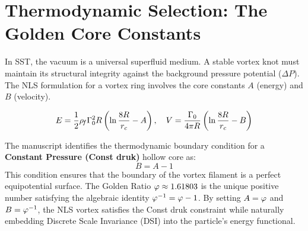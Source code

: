 \documentclass[11pt]{article}
\newcommand{\rc}{r_c}                                    %
\begin{document}
    \newpage



\begin{abstract}
This work formalizes the transition from classical Rankine vortex aggregates to a microscopic Nonlinear Schrödinger (NLS) framework within Swirl-String Theory (SST). We demonstrate that the thermodynamic requirement for a constant pressure (Const druk) hollow-core potential uniquely selects the Golden Ratio ($\phiG$) as the fundamental parameter for the vortex energy and velocity functionals. We provide an exact derivation of the electron rest mass, revealing a degenerate torus topology ($R_e < r_c$) that identifies the electron with Hill’s Spherical Vortex. Furthermore, we derive the reduced Planck constant ($\hbar$) from core fluid momentum and demonstrate that the anomalous magnetic moment emerges as a result of acoustic boundary-layer radiation. Finally, the lepton mass spectrum (Tau, Muon, Electron) is shown to be a discrete sequence of topological screening layers governed by the $\phiG^{-2k}$ scaling law.
\end{abstract}

\section{Thermodynamic Selection: The Golden Core Constants}
In SST, the vacuum is a universal superfluid medium. A stable vortex knot must maintain its structural integrity against the background pressure potential ($\Delta P$). The NLS formulation for a vortex ring involves the core constants $A$ (energy) and $B$ (velocity).

\begin{equation}
    E = \frac{1}{2} \rhof \Gammazero^2 R \left( \ln \frac{8R}{\rc} - A \right), \quad V = \frac{\Gammazero}{4\pi R} \left( \ln \frac{8R}{\rc} - B \right)
\end{equation}

The manuscript identifies the thermodynamic boundary condition for a \textbf{Constant Pressure (Const druk)} hollow core as:
\begin{equation}
    B = A - 1
\end{equation}
This condition ensures that the boundary of the vortex filament is a perfect equipotential surface. The Golden Ratio $\varphi \approx 1.61803$ is the unique positive number satisfying the algebraic identity $\varphi^{-1} = \varphi - 1$. By setting $A = \varphi$ and $B = \varphi^{-1}$, the NLS vortex satisfies the Const druk constraint while naturally embedding Discrete Scale Invariance (DSI) into the particle's energy functional.
\end{document}
